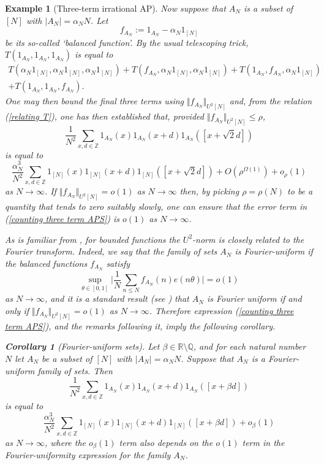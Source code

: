 \documentclass[12pt,a4paper,twoside,reqno]{amsart}
\newtheorem{Corollary}[Theorem]{Corollary}
\newtheorem{Example}[Theorem]{Example}
\numberwithin{equation}{section}
\begin{document}
\begin{Example}[Three-term irrational AP]
\emph{Now suppose that $A_N$ is a subset of $[N]$ with $\vert A_N \vert = \alpha_N N$. Let }
\begin{equation*}
f_{A_N}:=1_{A_N} - \alpha_N 1_{[N]}
\end{equation*}
\noindent \emph{be its so-called `balanced function'. By the usual telescoping trick, $T(1_{A_N},1_{A_N},1_{A_N})$ is equal to
\begin{align*}
T(\alpha_N 1_{[N]},\alpha_N 1_{[N]},\alpha_N 1_{[N]})+ 
T(f_{A_N},\alpha_N 1_{[N]},\alpha_N 1_{[N]})+T(1_{A_N},f_{A_N},\alpha_N 1_{[N]})\nonumber \\ +T(1_{A_N},1_{A_N},f_{A_N}).
\end{align*}
\noindent One may then bound the final three terms using $\Vert f_{A_N}\Vert_{U^2[N]}$ and, from the relation (\ref{relating T}), one has then established that, provided $\Vert f_{A_N}\Vert_{U^2[N]}\leqslant \rho$,
\begin{equation*}
\frac{1}{N^2}\sum\limits_{x,d\in \mathbb{Z}} 1_{A_N}(x)1_{A_N}(x+d)1_{A_N}([ x+\sqrt{2} d])
\end{equation*}
\noindent is equal to
\begin{equation}
\label{counting three term APS} \frac{\alpha_N^3}{N^2}\sum\limits_{x,d\in \mathbb{Z}} 1_{[N]}(x)1_{[N]}(x+d)1_{[N]}([ x+\sqrt{2} d]) +O(\rho^{\Omega(1)}) + o_{\rho}(1)
\end{equation}
as $N\rightarrow \infty$. If $\Vert f_{A_N}\Vert_{U^2[N]} = o(1)$ as $N\rightarrow \infty$ then, by picking $\rho = \rho(N)$ to be a quantity that tends to zero suitably slowly, one can ensure that the error term in (\ref{counting three term APS}) is $o(1)$ as $N\rightarrow \infty$.}

\emph{As is familiar from \cite{Go01}, for bounded functions the $U^2$-norm is closely related to the Fourier transform. Indeed, we say that the family of sets $A_N$ is Fourier-uniform if the balanced functions $f_{A_N}$ satisfy \[ \sup\limits_{\theta\in[0,1]}\Big\vert \frac{1}{N}\sum\limits_{n\leqslant N} f_{A_N}(n) e(n\theta)\Big\vert = o(1)\] as $N\rightarrow \infty$, and it is a standard result (see \cite[Exercise 1.3.18]{Ta12}) that $A_N$ is Fourier uniform if and only if $\Vert f_{A_N}\Vert_{U^2[N]} = o(1)$ as $N\rightarrow \infty$. Therefore expression (\ref{counting three term APS}), and the remarks following it, imply the following corollary.}
\begin{Corollary}[Fourier-uniform sets]
\label{Corollary for Fourier uniform sets}
Let $\beta \in \mathbb{R} \setminus \mathbb{Q}$, and for each natural number $N$ let $A_N$ be a subset of $[N]$ with $\vert A_N\vert = \alpha_N N$. Suppose that $A_N$ is a Fourier-uniform family of sets.  Then \[\frac{1}{N^2}\sum\limits_{x,d\in \mathbb{Z}} 1_{A_N}(x)1_{A_N}(x+d)1_{A_N}([ x+\beta d])\] is equal to \[\frac{\alpha_N^3}{N^2}\sum\limits_{x,d\in \mathbb{Z}} 1_{[N]}(x)1_{[N]}(x+d)1_{[N]}([ x+\beta d])+o_\beta(1)\] as $N\rightarrow \infty$, where the $o_{\beta}(1)$ term also depends on the $o(1)$ term in the Fourier-uniformity expression for the family $A_N$. 
\end{Corollary}
\end{Example}
\end{document}
